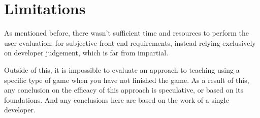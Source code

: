 \section{Limitations}\label{sec:results/limitations}
As mentioned before, there wasn't sufficient time and resources to perform the user evaluation, for subjective front-end requirements, instead relying exclusively on developer judgement, which is far from impartial.

Outside of this, it is impossible to evaluate an approach to teaching using a specific type of game when you have not finished the game. As a result of this, any conclusion on the efficacy of this approach is speculative, or based on its foundations. And any conclusions here are based on the work of a single developer.
 